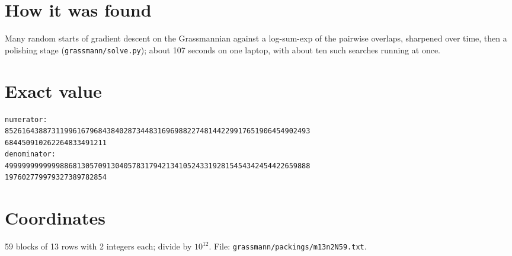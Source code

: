 \documentclass[11pt,a4paper]{article}
\begin{document}
\section{How it was found}
Many random starts of gradient descent on the Grassmannian against a log-sum-exp of the pairwise overlaps, sharpened over time, then a polishing stage (\texttt{grassmann/solve.py}); about 107 seconds on one laptop, with about ten such searches running at once.


\appendix
\section{Exact value}
{\small
\begin{verbatim}
numerator:
852616438873119961679684384028734483169698822748144229917651906454902493
684450910262264833491211
denominator:
499999999999988681305709130405783179421341052433192815454342454422659888
197602779979327389782854
\end{verbatim}}

\section{Coordinates}
59 blocks of 13 rows with 2 integers each; divide by $10^{12}$. File: \texttt{grassmann/packings/m13n2N59.txt}.
{\tiny
\begin{multicols}{4}
\end{multicols}}
\end{document}
